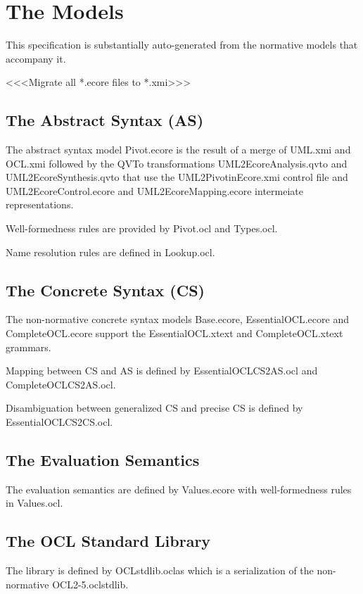 \chapter{The Models}\label{ocl:TheModels}

This specification is substantially auto-generated from the normative models that accompany it.

<<<Migrate all *.ecore files to *.xmi>>>

\section{The Abstract Syntax (AS)}

The abstract syntax model Pivot.ecore is the result of a merge of UML.xmi and OCL.xmi followed by the QVTo transformations UML2EcoreAnalysis.qvto and UML2EcoreSynthesis.qvto that use the UML2PivotinEcore.xmi control file and UML2EcoreControl.ecore and UML2EcoreMapping.ecore intermeiate representations.

Well-formedness rules are provided by Pivot.ocl and Types.ocl.

Name resolution rules are defined in Lookup.ocl.

\section{The Concrete Syntax (CS)}

The non-normative concrete syntax models Base.ecore, EssentialOCL.ecore and CompleteOCL.ecore support the EssentialOCL.xtext and CompleteOCL.xtext grammars.

Mapping between CS and AS is defined by EssentialOCLCS2AS.ocl and CompleteOCLCS2AS.ocl.

Disambiguation between generalized CS and precise CS is defined by EssentialOCLCS2CS.ocl.

\section{The Evaluation Semantics}

The evaluation semantics are defined by Values.ecore with well-formedness rules in Values.ocl.

\section{The OCL Standard Library}

The library is defined by OCLstdlib.oclas which is a serialization of the non-normative OCL2-5.oclstdlib.